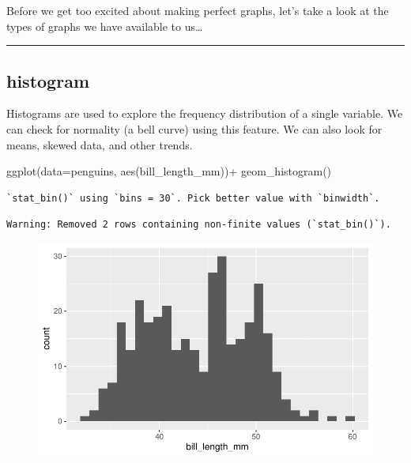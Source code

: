 \documentclass[
  letterpaper,
  DIV=11,
  numbers=noendperiod]{scrartcl}
\newenvironment{Shaded}{\begin{snugshade}}{\end{snugshade}}
\newcommand{\AttributeTok}[1]{\textcolor[rgb]{0.40,0.45,0.13}{#1}}
\newcommand{\FunctionTok}[1]{\textcolor[rgb]{0.28,0.35,0.67}{#1}}
\newcommand{\NormalTok}[1]{\textcolor[rgb]{0.00,0.23,0.31}{#1}}
\newcommand{\SpecialCharTok}[1]{\textcolor[rgb]{0.37,0.37,0.37}{#1}}
\begin{document}
Before we get too excited about making perfect graphs, let's take a look
at the types of graphs we have available to us\ldots{}

\begin{center}\rule{0.5\linewidth}{0.5pt}\end{center}

\subsection{\texorpdfstring{\textbf{histogram}}{histogram}}

Histograms are used to explore the frequency distribution of a single
variable. We can check for normality (a bell curve) using this feature.
We can also look for means, skewed data, and other trends.

\begin{Shaded}
\begin{Highlighting}[]
\FunctionTok{ggplot}\NormalTok{(}\AttributeTok{data=}\NormalTok{penguins, }\FunctionTok{aes}\NormalTok{(bill\_length\_mm))}\SpecialCharTok{+}
  \FunctionTok{geom\_histogram}\NormalTok{()}
\end{Highlighting}
\end{Shaded}

\begin{verbatim}
`stat_bin()` using `bins = 30`. Pick better value with `binwidth`.
\end{verbatim}

\begin{verbatim}
Warning: Removed 2 rows containing non-finite values (`stat_bin()`).
\end{verbatim}

\begin{figure}[H]

{\centering \includegraphics{basic_graphs_files/figure-pdf/unnamed-chunk-6-1.pdf}

}

\end{figure}
\end{document}
